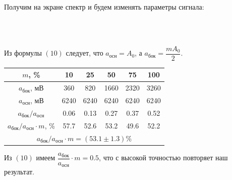 \documentclass[a4paper,12pt]{article}
\begin{document}
Получим на экране спектр и будем изменять параметры сигнала:
\begin{figure}[h]
    \centering
    \\
        			
\end{figure}\\
Из формулы $(10)$ следует, что $a_{\text{осн}} = A_0$, а $a_{\text{бок}} = \dfrac{mA_0}{2}$.
\begin{center}
\begin{tabular}{|c|c|c|c|c|c|}
\hline
$m$, \% & 10 & 25 & 50 & 75 & 100 \\ \hline
$a_{\text{бок}}$, мВ & 360 & 820 & 1660 & 2320 & 3260 \\ \hline
$a_{\text{осн}}$, мВ & 6240 & 6240 & 6240 & 6240 & 6240 \\ \hline
$a_{\text{бок}}/a_{\text{осн}}$ & 0.06 & 0.13 & 0.27 & 0.37 & 0.52 \\ \hline
$a_{\text{бок}}/a_{\text{осн}} \cdot m$, \% & 57.7 & 52.6 & 53.2 & 49.6 & 52.2 \\ \hline
\multicolumn{6}{|c|}{$a_{\text{бок}}/a_{\text{осн}} \cdot m = (53.1 \pm 1.3)$\%} \\ \hline
\end{tabular}
\end{center}
Из $(10)$ имеем $\dfrac{a_{\text{бок}}}{a_{\text{осн}}} \cdot m = 0.5$, что с высокой точностью повторяет наш результат.
\end{document}
